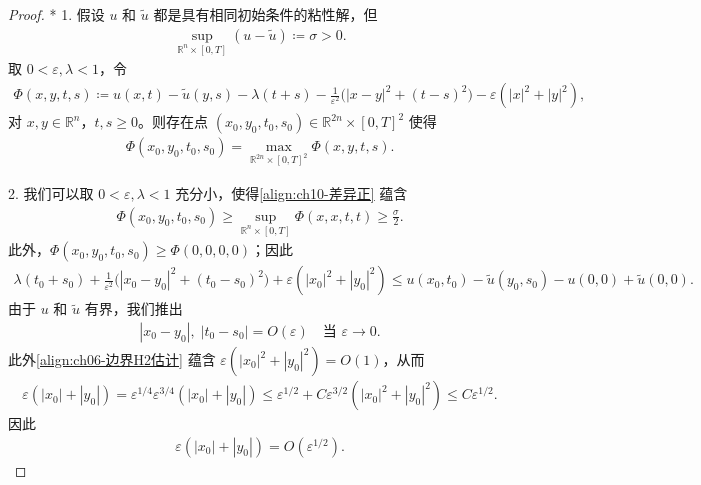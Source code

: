 \documentclass[../../main.tex]{subfiles}
\begin{document}
\begin{proof}*
1. 假设 $u$ 和 $\widetilde{u}$ 都是具有相同初始条件的粘性解，但
\begin{align}
\sup_{\mathbb{R}^n\times[0,T]}(u-\widetilde{u}) \coloneqq \sigma > 0.
\label{align:ch10-差异正}
\end{align}
取 $0<\varepsilon,\lambda<1$，令
\begin{align}
\Phi(x,y,t,s) \coloneqq u(x,t)-\widetilde{u}(y,s)-\lambda(t+s)-\frac{1}{\varepsilon^2}\big(|x-y|^2+(t-s)^2\big)-\varepsilon(|x|^2+|y|^2),
\label{align:ch10-加倍变量函数}
\end{align}
对 $x,y\in\mathbb{R}^n$，$t,s\geqslant 0$。则存在点 $(x_0,y_0,t_0,s_0)\in\mathbb{R}^{2n}\times[0,T]^2$ 使得
\begin{align}
\Phi(x_0,y_0,t_0,s_0)=\max_{\mathbb{R}^{2n}\times[0,T]^2}\Phi(x,y,t,s).
\label{align:ch06-内最大}
\end{align}

2. 我们可以取 $0<\varepsilon,\lambda<1$ 充分小，使得\eqref{align:ch10-差异正} 蕴含
\begin{align}
\Phi(x_0,y_0,t_0,s_0)\geqslant \sup_{\mathbb{R}^n\times[0,T]}\Phi(x,x,t,t)\geqslant \frac{\sigma}{2}.
\label{align:ch06-下解}
\end{align}
此外，$\Phi(x_0,y_0,t_0,s_0)\geqslant\Phi(0,0,0,0)$；因此
\begin{align}
\lambda(t_0+s_0)+\frac{1}{\varepsilon^2}\big(|x_0-y_0|^2+(t_0-s_0)^2\big)+\varepsilon(|x_0|^2+|y_0|^2)\leqslant u(x_0,t_0)-\widetilde{u}(y_0,s_0)-u(0,0)+\widetilde{u}(0,0).
\label{align:ch06-边界H2估计}
\end{align}
由于 $u$ 和 $\widetilde{u}$ 有界，我们推出
\begin{align}
|x_0-y_0|,\;|t_0-s_0| = O(\varepsilon) \quad \text{当 } \varepsilon\to 0.
\label{align:ch10-距离Oeps}
\end{align}
此外\eqref{align:ch06-边界H2估计} 蕴含 $\varepsilon(|x_0|^2+|y_0|^2)=O(1)$，从而
\begin{align*}
\varepsilon(|x_0|+|y_0|) = \varepsilon^{1/4}\varepsilon^{3/4}(|x_0|+|y_0|)\leqslant \varepsilon^{1/2}+C\varepsilon^{3/2}(|x_0|^2+|y_0|^2)\leqslant C\varepsilon^{1/2}.
\end{align*}
因此
\begin{align}
\varepsilon(|x_0|+|y_0|)=O(\varepsilon^{1/2}).
\label{align:ch10-距离Oeps12}
\end{align}


\end{proof}
\end{document}
